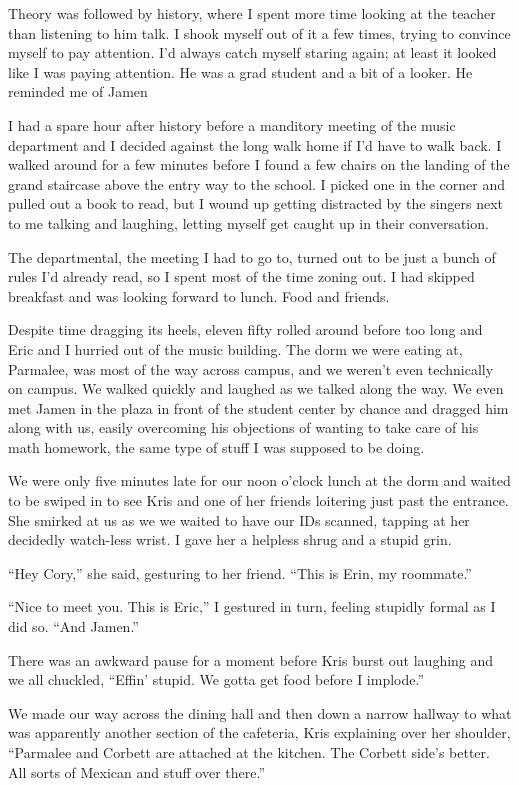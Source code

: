 Theory was followed by history, where I spent more time looking at the teacher than listening to him talk.  I shook myself out of it a few times, trying to convince myself to pay attention.  I'd always catch myself staring again; at least it looked like I was paying attention.  He was a grad student and a bit of a looker.  He reminded me of Jamen

I had a spare hour after history before a manditory meeting of the music department and I decided against the long walk home if I'd have to walk back.  I walked around for a few minutes before I found a few chairs on the landing of the grand staircase above the entry way to the school.  I picked one in the corner and pulled out a book to read, but I wound up getting distracted by the singers next to me talking and laughing, letting myself get caught up in their conversation.

The departmental, the meeting I had to go to, turned out to be just a bunch of rules I'd already read, so I spent most of the time zoning out.  I had skipped breakfast and was looking forward to lunch.  Food and friends.

Despite time dragging its heels, eleven fifty rolled around before too long and Eric and I hurried out of the music building.  The dorm we were eating at, Parmalee, was most of the way across campus, and we weren't even technically on campus.  We walked quickly and laughed as we talked along the way.  We even met Jamen in the plaza in front of the student center by chance and dragged him along with us, easily overcoming his objections of wanting to take care of his math homework, the same type of stuff I was supposed to be doing.

We were only five minutes late for our noon o'clock lunch at the dorm and waited to be swiped in to see Kris and one of her friends loitering just past the entrance.  She smirked at us as we we waited to have our IDs scanned, tapping at her decidedly watch-less wrist.  I gave her a helpless shrug and a stupid grin.

``Hey Cory,'' she said, gesturing to her friend.  ``This is Erin, my roommate.''

``Nice to meet you.  This is Eric,'' I gestured in turn, feeling stupidly formal as I did so.  ``And Jamen.''

There was an awkward pause for a moment before Kris burst out laughing and we all chuckled, ``Effin' stupid.  We gotta get food before I implode.''

We made our way across the dining hall and then down a narrow hallway to what was apparently another section of the cafeteria, Kris explaining over her shoulder, ``Parmalee and Corbett are attached at the kitchen.  The Corbett side's better.  All sorts of Mexican and stuff over there.''

